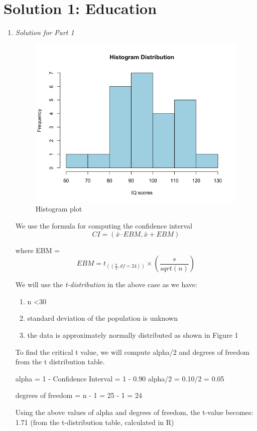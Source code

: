 \documentclass[12pt,letterpaper]{article}
\begin{document}
\section*{Solution 1: Education}

\vspace{3mm}
\begin{enumerate}
    \item \textit{Solution for Part 1}
    
       \begin{figure}[h]
              \centering
              \includegraphics[width=0.5\linewidth]{images/histogram_plot.png}
              \caption{Histogram plot}
          \end{figure}
    
    We use the formula for computing the confidence interval
            \[ CI = (\bar{x} – EBM, \bar{x} + EBM) \]

       where EBM = 
        \[ EBM =  t_(\left(\frac{\alpha}{2}, df=24\right)) \times \left(\frac{s}{sqrt(n)}\right) \]

    We will use the \textit{t-distribution} in the above case as we have:

        \begin{enumerate}
          \item n \textless 30
          \item standard deviation of the population is unknown
          \item the data is approximately normally distributed as shown in Figure 1
        \end{enumerate}


    To find the critical t value, we will compute alpha/2 and degrees of freedom from the t distribution table. 

        alpha = 1 - Confidence Interval = 1 - 0.90 
        alpha/2 = 0.10/2 = 0.05

        degrees of freedom = n - 1 = 25 - 1 = 24

    Using the above values of alpha and degrees of freedom, the t-value becomes: 1.71 (from the t-distribution table, calculated in R)


\end{enumerate}
\end{document}
